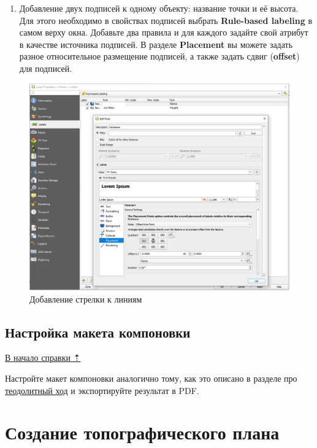 \documentclass[
  12pt,
]{book}
\providecommand{\tightlist}{%
  \setlength{\itemsep}{0pt}\setlength{\parskip}{0pt}}
\begin{document}
\begin{enumerate}
\def\labelenumi{\arabic{enumi})}
\setcounter{enumi}{1}
\tightlist
\item
  Добавление двух подписей к одному объекту: название точки и её высота. Для этого необходимо в свойствах подписей выбрать \textbf{Rule-based labeling} в самом верху окна. Добавьте два правила и для каждого задайте свой атрибут в качестве источника подписей. В разделе \textbf{Placement} вы можете задать разное относительное размещение подписей, а также задать сдвиг (\textbf{offset}) для подписей.
\end{enumerate}

\begin{figure}
\centering
\includegraphics{images/Practice/Rule-Based_Labeling.png}
\caption{Добавление стрелки к линиям}
\end{figure}

\subsection{Настройка макета компоновки}\label{practice-level-layout}

\hyperref[practice-level]{В начало справки ⇡}

Настройте макет компоновки аналогично тому, как это описано в разделе про \hyperref[practice-theod-layout]{теодолитный ход} и экспортируйте результат в PDF.

\section{Создание топографического плана}\label{practice-topo}
\end{document}

